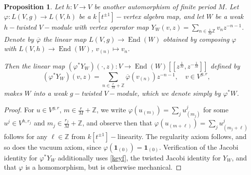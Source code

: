 \documentclass[10pt,a4paper]{amsart}
\newtheorem{prop}{Proposition}
\def\End{\ensuremath{\operatorname{End}}}
\begin{document}
\begin{prop}\label{tfiso}
    Let $h \colon V \to V$ be another automorphism of finite period $M$. Let $\varphi \colon L(V,g) \to L(V,h)$ be a $k[t^{\pm1}]-$vertex algebra map, and let $W$ be a weak $h-$twisted $V-$module with vertex operator map $Y_W(v,z) = \sum_{n \in \frac{1}{M} \mathbb Z} v_n z^{-n-1}$. 
    Denote by $\overline \varphi$ the linear map $L(V,g) \to \End(W)$ obtained by composing $\varphi$ with $L(V,h) \to \End(W)$, $v_{(n)} \mapsto v_n$. 
    
    Then the linear map $(\varphi^\ast Y_W)(\cdot, z) \colon V \to \End(W)[[z^{\frac{1}{M}},z^{-\frac{1}{M}}]]$ defined by 
	   \[ (\varphi^\ast Y_W) (v,z) = \sum_{n \in \frac{r}{M} + \mathbb Z} \overline \varphi(v_{(n)}) z^{-n-1}, \quad v \in V^{g,r}, \]
    makes $W$ into a weak $g-$twisted $V-$module, which we denote simply by $\varphi^\ast W$.
\end{prop}

\begin{proof}
	For $u \in V^{g,r}$, $m \in \frac{r}{M} + \mathbb Z$, we write $\varphi(u_{(m)}) = \sum_j u^j_{(m_j)}$ for some $u^j \in V^{h, r_j}$ and $m_j \in \frac{r_j}{M} + \mathbb Z$, and observe then that $\varphi (u_{(m+\ell)}) = \sum_j u^j_{(m_j+\ell)}$ follows for any $\ell \in \mathbb Z$ from $k[t^{\pm 1}]-$linearity.
	The regularity axiom follows, and so does the vacuum axiom, since $\varphi(\mathbf 1_{(0)}\!) = \mathbf 1_{(0)}$.
	Verification of the Jacobi identity  for $\varphi^\ast Y_W$ additionally uses \eqref{keyf}, the twisted Jacobi identity for $Y_W$, and that $\varphi$ is a homomorphism, but is otherwise mechanical.
\end{proof}
\end{document}
